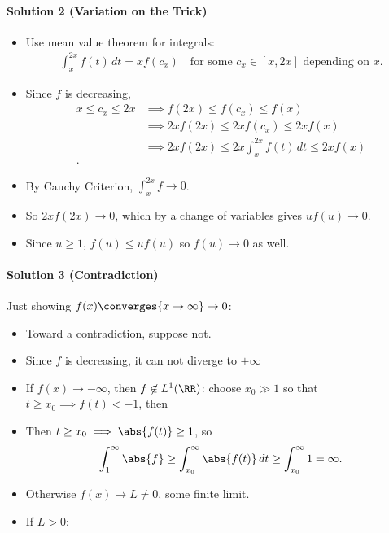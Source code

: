 \begin{solution}
\hypertarget{solution-2-variation-on-the-trick}{%
\paragraph{Solution 2 (Variation on the
Trick)}\label{solution-2-variation-on-the-trick}}

\begin{itemize}
\item
  Use mean value theorem for integrals: \begin{align*}
  \int_x^{2x} f(t)\, dt = xf(c_x) \quad\text{for some $c_x \in [x, 2x]$ depending on $x$}
  .\end{align*}
\item
  Since \(f\) is decreasing, \begin{align*}
  x\leq c_x \leq 2x 
  &\implies f(2x)\leq f(c_x) \leq f(x) \\
  &\implies 2xf(2x)\leq 2xf(c_x) \leq 2xf(x) \\
  &\implies 2xf(2x)\leq 2x\int_x^{2x} f(t)\, dt \leq 2xf(x) \\
  .\end{align*}
\item
  By Cauchy Criterion, \(\int_x^{2x} f \to 0\).
\item
  So \(2x f(2x) \to 0\), which by a change of variables gives
  \(uf(u) \to 0\).
\item
  Since \(u\geq 1\), \(f(u) \leq uf(u)\) so \(f(u) \to 0\) as well.
\end{itemize}

\hypertarget{solution-3-contradiction}{%
\paragraph{Solution 3 (Contradiction)}\label{solution-3-contradiction}}

\hfill

Just showing \(f(x) \converges{x\to \infty}\to 0\):

\begin{itemize}
\item
  Toward a contradiction, suppose not.
\item
  Since \(f\) is decreasing, it can not diverge to \(+\infty\)
\item
  If \(f(x) \to -\infty\), then \(f\not\in L^1(\RR)\): choose
  \(x_0 \gg 1\) so that \(t\geq x_0 \implies f(t) < -1\), then
\item
  Then \(t\geq x_0 \implies \abs{f(t)} \geq 1\), so \begin{align*}
  \int_1^\infty \abs{f} \geq \int_{x_0}^\infty \abs{f(t) } \, dt \geq \int_{x_0}^\infty 1 =\infty
   .\end{align*}
\item
  Otherwise \(f(x) \to L\neq 0\), some finite limit.
\item
  If \(L>0\):


\end{itemize}
\end{solution}

